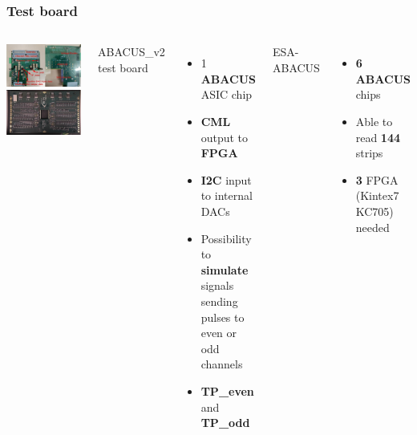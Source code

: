 \documentclass[aspectratio=169]{beamer}
\begin{document}
	\begin{frame}
	\frametitle{Test board}
		\begin{columns}
			\begin{center}
				\includegraphics[width=0.8 \textwidth]{IMG/TestBoard.pdf}
				\includegraphics[width=0.8 \textwidth]{IMG/EsaAbacus.png}
			\end{center}
			{\color{blue}ABACUS\_v2 test board}
			\begin{itemize}
				\item 1 \textbf{ABACUS} ASIC chip
				\item \textbf{CML} output to \textbf{FPGA}
				\item \textbf{I2C} input to internal DACs
				\item Possibility to \textbf{simulate} signals sending pulses to even or odd channels
				\item \textbf{TP\_even} and \textbf{TP\_odd} 
			\end{itemize}
			{\color{blue}ESA-ABACUS}
			\begin{itemize}
				\item \textbf{6 ABACUS} chips
				\item Able to read \textbf{144} strips
				\item \textbf{3} FPGA (Kintex7 KC705) needed
			\end{itemize}
		\end{columns}	
	\end{frame}
\end{document}
